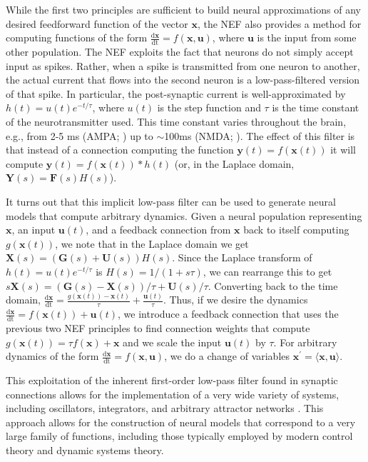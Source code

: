 \documentclass[english]{article}
\begin{document}
While the first two principles are sufficient to build neural approximations
of any desired feedforward function of the vector $\mathbf{x}$, the NEF also
provides a method for computing functions of the form \textbf{$\mathbf{\frac{\mathrm{d}x}{\mathrm{dt}}=}f(\mathbf{x},\mathbf{u})$},
where $\mathbf{u}$ is the input from some other population. The NEF exploits the fact that neurons do not simply accept input
as spikes. Rather, when a spike is transmitted from one neuron to
another, the actual current that flows into the second neuron is a
low-pass-filtered version of that spike. In particular, the post-synaptic
current is well-approximated by $h(t)=u(t)e^{-t/\tau}$, where $u(t)$
is the step function and $\tau$ is the time constant of the neurotransmitter
used. This time constant varies throughout the brain, e.g., from 2-5
ms (AMPA; \cite{jonas1993quantal}) up to $\sim$100ms (NMDA;
\cite{sah1990properties}). The effect of this filter is that instead
of a connection computing the function $\mathbf{y}(t)=f(\mathbf{x}(t))$
it will compute $\mathbf{y}(t)=f(\mathbf{x}(t))*h(t)$ (or, in the
Laplace domain, $\mathbf{Y}(s)=\mathbf{F}(s)H(s)$).

It turns out that this implicit low-pass filter can be used to generate
neural models that compute arbitrary dynamics. Given a neural population
representing $\mathbf{x}$, an input $\mathbf{u}(t)$, and a feedback
connection from $\mathbf{x}$ back to itself computing $g(\mathbf{x}(t))$,
we note that in the Laplace domain we get $\mathbf{X}(s)=(\mathbf{G}(s)+\mathbf{U}(s))H(s)$.
Since the Laplace transform of $h(t)=u(t)e^{-t/\tau}$ is $H(s)=1/(1+s\tau)$,
we can rearrange this to get $s\mathbf{X}(s)=(\mathbf{G}(s)-\mathbf{X}(s))/\tau+\mathbf{U}(s)/\tau$.
Converting back to the time domain, \textbf{$\mathbf{\frac{\mathrm{d}x}{\mathrm{dt}}=}\frac{g(\mathbf{x}(t))-\mathbf{x}(t)}{\tau}+\frac{\mathbf{u}(t)}{\tau}$}.
Thus, if we desire the dynamics \textbf{$\mathbf{\frac{\mathrm{d}x}{\mathrm{dt}}=}f(\mathbf{x}(t))+\mathbf{u}(t)$},
we introduce a feedback connection that uses the previous two NEF
principles to find connection weights that compute $g(\mathbf{x}(t))=\tau f(\mathbf{x})+\mathbf{x}$
and we scale the input $\mathbf{u}(t)$ by $\tau$. For arbitrary
dynamics of the form \textbf{$\mathbf{\frac{\mathrm{d}x}{\mathrm{dt}}=}f(\mathbf{x},\mathbf{u})$},
we do a change of variables $\mathbf{x}^{\prime}=\langle\mathbf{x},\mathbf{u}\rangle$. 

This exploitation of the inherent first-order low-pass filter found
in synaptic connections allows for the implementation of a very wide
variety of systems, including oscillators, integrators, and arbitrary
attractor networks \cite{Eliasmith2005p}. 
This approach allows for the construction of neural models that correspond
to a very large family of functions, including those typically employed
by modern control theory and dynamic systems theory.
\end{document}
